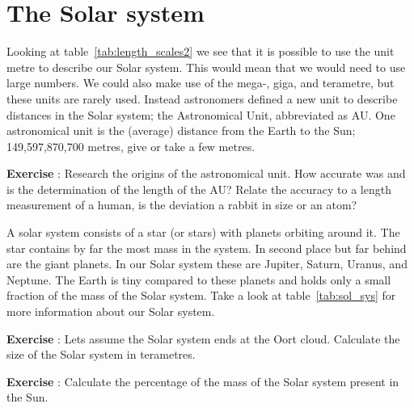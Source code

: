 \section{The Solar system}
Looking at table~\ref{tab:length_scales2} we see that it is possible to use the unit metre to describe our Solar system. This would mean that we would need to use large numbers. We could also make use of the mega-, giga, and terametre, but these units are rarely used. Instead astronomers defined a new unit to describe distances in the Solar system; the Astronomical Unit, abbreviated as AU.
One astronomical unit is the (average) distance from the Earth to the Sun; 149,597,870,700 metres, give or take a few metres.
\begin{shaded}
\textbf{Exercise \theExercise {}} : Research the origins of the astronomical unit. How accurate was and is the determination of the length of the AU? Relate the accuracy to a length measurement of a human, is the deviation a rabbit in size or an atom?\end{shaded}

A solar system consists of a star (or stars) with planets orbiting around it. The star contains by far the most mass in the system. In second place but far behind are the giant planets. In our Solar system these are Jupiter, Saturn, Uranus, and Neptune. The Earth is tiny compared to these planets and holds only a small fraction of the mass of the Solar system. Take a look at table~\ref{tab:sol_sys} for more information about our Solar system.
\begin{shaded}
\textbf{Exercise \theExercise {}} : Lets assume the Solar system ends at the Oort cloud. Calculate the size of the Solar system in terametres.\end{shaded}
\begin{shaded}
\textbf{Exercise \theExercise {}} : Calculate the percentage of the mass of the Solar system present in the Sun.\end{shaded}

